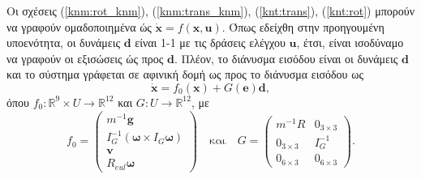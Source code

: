Οι σχέσεις (\ref{knm:rot_knm}), (\ref{knm:trans_knm}), (\ref{knt:trans}), 
(\ref{knt:rot}) μπορούν να γραφούν ομαδοποιημένα ώς $\mathbf{\dot x} = 
f(\mathbf{x}, \mathbf{u})$. Όπως εδείχθη στην προηγουμένη υποενότητα, οι 
δυνάμεις $\mathbf{d}$ είναι 1-1 με τις δράσεις ελέγχου $ \mathbf{u}$, έτσι, 
είναι ισοδύναμο να γραφούν οι εξισώσεις ώς προς $\mathbf{d}$. Πλέον, το διάνυσμα 
εισόδου είναι οι δυνάμεις $\mathbf{d}$ και το σύστημα γράφεται σε αφινική δομή 
ως προς το διάνυσμα εισόδου ως
\begin{equation*}
    \mathbf{\dot x} = f_0(\mathbf{x}) + G(\mathbf{e}) \mathbf{d},
\end{equation*}
όπου $f_0: \mathbb{R}^{9}\!\times U \rightarrow \mathbb{R}^{12}$ 
και $G:U\rightarrow\mathbb{R}^{12}$, με
\begin{equation*}
    f_0 = 
    \begin{pmatrix}
        m^{-1}\!\mathbf{g} \\
        I_G^{-1}\left(\bm{\omega}\times I_G\bm{\omega}\right) \\
        \mathbf{v}\\
        R_{eul}\bm{\omega}
    \end{pmatrix}
    \quad\text{και}\quad
    G = \begin{pmatrix}
        m^{-1}R & 0_{3\times 3}\\
        0_{3\times 3} & I_G^{-1}\\
        0_{6\times 3} & 0_{6\times 3}
    \end{pmatrix}.
\end{equation*}